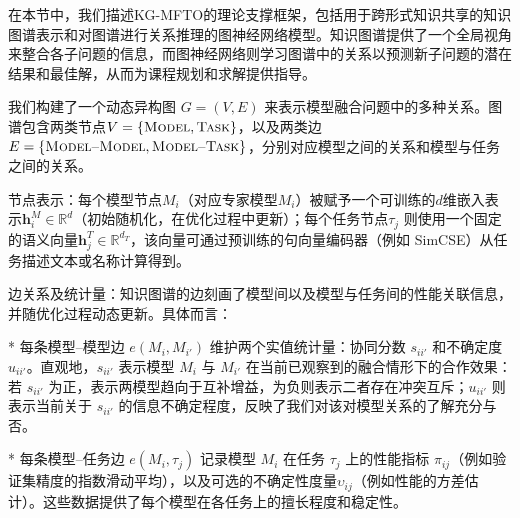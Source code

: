 \documentclass[../main.tex]{subfiles}
\begin{document}

在本节中，我们描述KG-MFTO的理论支撑框架，包括用于跨形式知识共享的知识图谱表示和对图谱进行关系推理的图神经网络模型。知识图谱提供了一个全局视角来整合各子问题的信息，而图神经网络则学习图谱中的关系以预测新子问题的潜在结果和最佳解，从而为课程规划和求解提供指导。


我们构建了一个动态异构图 $G=(V,E)$ 来表示模型融合问题中的多种关系。图谱包含两类节点$V=\{\textsc{Model}, \textsc{Task}\}$，以及两类边$E=\{\textsc{Model--Model}, \textsc{Model--Task}\}$，分别对应模型之间的关系和模型与任务之间的关系。

节点表示：每个模型节点$M_i$（对应专家模型$M_i$）被赋予一个可训练的$d$维嵌入表示$\mathbf{h}^M_i \in \mathbb{R}^d$（初始随机化，在优化过程中更新）；每个任务节点$\tau_j$ 则使用一个固定的语义向量$\mathbf{h}^T_j \in \mathbb{R}^{d_T}$，该向量可通过预训练的句向量编码器（例如 SimCSE）从任务描述文本或名称计算得到。

边关系及统计量：知识图谱的边刻画了模型间以及模型与任务间的性能关联信息，并随优化过程动态更新。具体而言：

* 每条模型--模型边 $e(M_i, M_{i'})$ 维护两个实值统计量：协同分数 $s_{ii'}$ 和不确定度 $u_{ii'}$。直观地，$s_{ii'}$ 表示模型 $M_i$ 与 $M_{i'}$ 在当前已观察到的融合情形下的合作效果：若 $s_{ii'}$ 为正，表示两模型趋向于互补增益，为负则表示二者存在冲突互斥；$u_{ii'}$ 则表示当前关于 $s_{ii'}$ 的信息不确定程度，反映了我们对该对模型关系的了解充分与否。

* 每条模型--任务边 $e(M_i, \tau_j)$ 记录模型 $M_i$ 在任务 $\tau_j$ 上的性能指标 $\pi_{ij}$（例如验证集精度的指数滑动平均），以及可选的不确定性度量$\upsilon_{ij}$（例如性能的方差估计）。这些数据提供了每个模型在各任务上的擅长程度和稳定性。
\end{document}
